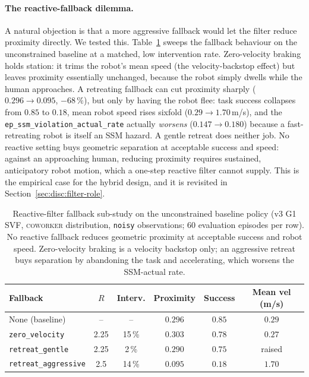 \documentclass[11pt,a4paper]{report}
\newcommand{\ssm}{SSM}
\newcommand{\coworker}{\textsc{coworker}}
\begin{document}
\paragraph{The reactive-fallback dilemma.}
A natural objection is that a more aggressive fallback would let the
filter reduce proximity directly. We tested this. Table~\ref{tab:filter-fallback}
sweeps the fallback behaviour on the unconstrained baseline at a
matched, low intervention rate. Zero-velocity braking holds station:
it trims the robot's mean speed (the velocity-backstop effect) but
leaves proximity essentially unchanged, because the robot simply
dwells while the human approaches. A retreating fallback can cut
proximity sharply ($0.296 \rightarrow 0.095$, $-68\,\%$), but only by
having the robot flee: task success collapses from $0.85$ to $0.18$,
mean robot speed rises sixfold ($0.29 \rightarrow 1.70$\,m/s), and the
\texttt{ep\_ssm\_violation\_actual\_rate} actually \emph{worsens}
($0.147 \rightarrow 0.180$) because a fast-retreating robot is itself
an \ssm{} hazard. A gentle retreat does neither job. No reactive
setting buys geometric separation at acceptable success and speed:
against an approaching human, reducing proximity requires sustained,
anticipatory robot motion, which a one-step reactive filter cannot
supply. This is the empirical case for the hybrid design, and it is
revisited in Section~\ref{sec:disc:filter-role}.

\begin{table}[h]
\centering
\small
\caption{Reactive-filter fallback sub-study on the unconstrained
baseline policy (v3 G1 SVF, \coworker{} distribution, \texttt{noisy}
observations; 60 evaluation episodes per row). No reactive fallback
reduces geometric proximity at acceptable success and robot speed.
Zero-velocity braking is a velocity backstop only; an aggressive
retreat buys separation by abandoning the task and accelerating,
which worsens the \ssm{}-actual rate.}
\label{tab:filter-fallback}
\begin{tabular}{lccccc}
\toprule
Fallback & $R$ & Interv. & Proximity & Success & Mean vel (m/s) \\
\midrule
None (baseline)        & --   & --      & $0.296$ & $0.85$ & $0.29$ \\
\texttt{zero\_velocity}    & 2.25 & 15\,\% & $0.303$ & $0.78$ & $0.27$ \\
\texttt{retreat\_gentle}   & 2.25 & 2\,\%  & $0.290$ & $0.75$ & raised \\
\texttt{retreat\_aggressive} & 2.5 & 14\,\% & $0.095$ & $0.18$ & $1.70$ \\
\bottomrule
\end{tabular}
\end{table}
\end{document}
